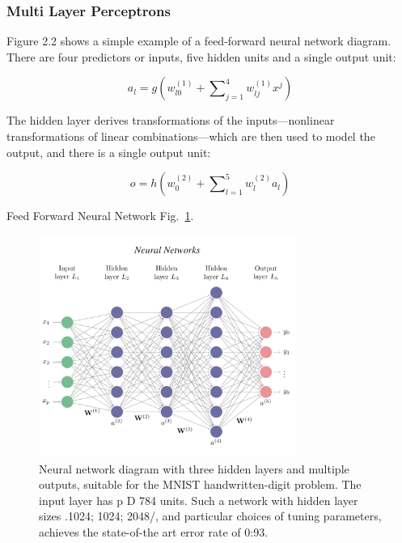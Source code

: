 \subsubsection*{Multi Layer Perceptrons}
Figure 2.2 shows a simple example of a feed-forward neural network diagram. There are four predictors or inputs, five hidden units and a single output unit:

\begin{equation}
a_{l} =g\left( w^{( 1)}_{l0} +\sum\nolimits ^{4}_{j=1} w^{( 1)}_{lj} x^{j}\right)
\label{four input units and five hidden units}
\end{equation}

The hidden layer derives transformations of the
inputs—nonlinear transformations of linear combinations—which are then used to model the output, and there is a single output unit:

\begin{equation}
 o=h\left( w^{( 2)}_{0} +\sum\nolimits ^{5}_{l=1} w^{( 2)}_{l} a_{l}\right)
 \label{single output units}
\end{equation}

Feed Forward Neural Network Fig.~\ref{fig:multi-layer}.
\begin{figure}[htbp]
\centering
\includegraphics[width=0.75\textwidth]{images/NN.png}
\caption{Neural network diagram with three hidden layers and multiple outputs, suitable for the MNIST handwritten-digit problem. The input layer has p D 784 units. Such a network with hidden layer sizes .1024; 1024; 2048/, and particular choices of tuning parameters, achieves the state-of-the art error rate of 0:93.\protect\footnotemark}
\label{fig:multi-layer}
\end{figure}

